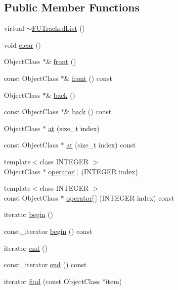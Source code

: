 \subsection*{Public Member Functions}
\begin{DoxyCompactItemize}
\item 
virtual \hyperlink{classFUTrackedList_ad730ca17f8231dd5532666d8bf80f00d}{$\sim$FUTrackedList} ()
\item 
void \hyperlink{classFUTrackedList_a9635878f68eab4f01a4aa63ad383137b}{clear} ()
\item 
ObjectClass $\ast$\& \hyperlink{classFUTrackedList_a88c999b20be2b2a2047c7951beb253b7}{front} ()
\item 
const ObjectClass $\ast$\& \hyperlink{classFUTrackedList_a99bc7ac1138ef4a3db1fd47bfb44c6ff}{front} () const 
\item 
ObjectClass $\ast$\& \hyperlink{classFUTrackedList_ab5fdc0c96b25954dd2e79a689507f798}{back} ()
\item 
const ObjectClass $\ast$\& \hyperlink{classFUTrackedList_a01ec28e90a1ffb6718a9aa2c99672867}{back} () const 
\item 
ObjectClass $\ast$ \hyperlink{classFUTrackedList_a02f8513855a343d1446a0ee4a3ef189d}{at} (size\_\-t index)
\item 
const ObjectClass $\ast$ \hyperlink{classFUTrackedList_a754719106b3cb07fa3156116fdea6454}{at} (size\_\-t index) const 
\item 
{\footnotesize template$<$class INTEGER $>$ }\\ObjectClass $\ast$ \hyperlink{classFUTrackedList_a2244033eb12fe7aa6814007eee7a0182}{operator\mbox{[}$\,$\mbox{]}} (INTEGER index)
\item 
{\footnotesize template$<$class INTEGER $>$ }\\const ObjectClass $\ast$ \hyperlink{classFUTrackedList_a0923280d552dd1ed005a2c592ff4f790}{operator\mbox{[}$\,$\mbox{]}} (INTEGER index) const 
\item 
iterator \hyperlink{classFUTrackedList_ab85af6466a6a5b93fc8302fa12a8b719}{begin} ()
\item 
const\_\-iterator \hyperlink{classFUTrackedList_a526d284d9253181fe8494c357d07f1db}{begin} () const 
\item 
iterator \hyperlink{classFUTrackedList_a8ae5e0a0b3069c9789c04e1456d4f6e3}{end} ()
\item 
const\_\-iterator \hyperlink{classFUTrackedList_a1fc9f5d51f4b7a94f4a99de81701e784}{end} () const 
\item 
iterator \hyperlink{classFUTrackedList_ac145979c8492c626cf0c892b8f72820c}{find} (const ObjectClass $\ast$item)

\end{DoxyCompactItemize}
